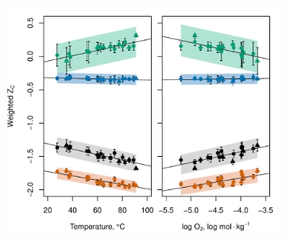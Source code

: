 \singlespace
\begin{figure}[h]
\centering
    \begin{subfigure}[b]{0.81\linewidth}
        	\includegraphics[width=1\linewidth]{"figs_ch1/scatterplot - weighted ZC of IPL components vs temp and logO2"}
    \end{subfigure}
    \begin{subfigure}[b]{0.18\linewidth}

\end{subfigure}
\end{figure}

